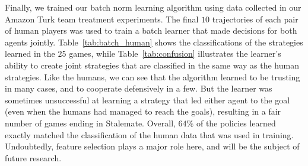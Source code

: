 Finally, we trained our batch norm learning algorithm using data
collected in our 
Amazon Turk team treatment experiments. The final $10$ trajectories of
each pair of human players was used to train a batch learner that made
decisions for both agents jointly. Table~\ref{tab:batch_human} shows
the classifications of the strategies learned in the $25$ games, while
Table~\ref{tab:confusion} illustrates the learner's ability to create
joint strategies that are classified in the same way as the human
strategies.
%
Like the humans, we can see that the algorithm learned to be trusting
in many cases, and to cooperate defensively in a few.  But the learner
was sometimes unsuccessful at learning a strategy that led either
agent to the goal (even when the humans had managed to reach the
goals), resulting in a fair number of games ending in Stalemate.
Overall, $64\%$ of the policies learned exactly matched the
classification of the human data that was used in training.
Undoubtedly, feature selection plays a major role here,
and will be the subject of future research.




